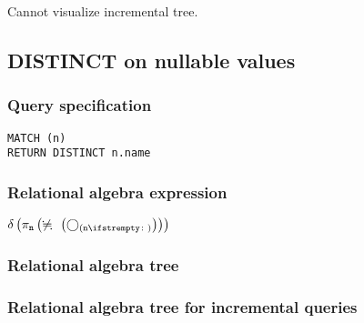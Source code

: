Cannot visualize incremental tree.

\subsection{DISTINCT on nullable values}

\subsubsection*{Query specification}

\begin{lstlisting}
MATCH (n)
RETURN DISTINCT n.name
\end{lstlisting}

\subsubsection*{Relational algebra expression}

$\duplicateelimination \left(\projection{\var{n}} \left(\alldifferent{} \left(\getvertices{n}{}\right)\right)\right)$

\subsubsection*{Relational algebra tree}


\subsubsection*{Relational algebra tree for incremental queries}


